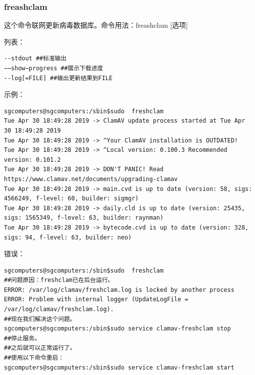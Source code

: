 \documentclass{book}
\begin{document}
\subsubsection{freashclam}
\cite{mancf}\par
这个命令联网更新病毒数据库。命令用法：freashclam [选项] \par
[选项]列表：\par
\begin{verbatim}
--stdout ##标准输出
−−show−progress ##展示下载进度
--log[=FILE] ##输出更新结果到FILE
\end{verbatim}
示例：
\begin{verbatim}
sgcomputers@sgcomputers:/sbin$sudo  freshclam
Tue Apr 30 18:49:28 2019 -> ClamAV update process started at Tue Apr 30 18:49:28 2019
Tue Apr 30 18:49:28 2019 -> ^Your ClamAV installation is OUTDATED!
Tue Apr 30 18:49:28 2019 -> ^Local version: 0.100.3 Recommended version: 0.101.2
Tue Apr 30 18:49:28 2019 -> DON'T PANIC! Read https://www.clamav.net/documents/upgrading-clamav
Tue Apr 30 18:49:28 2019 -> main.cvd is up to date (version: 58, sigs: 4566249, f-level: 60, builder: sigmgr)
Tue Apr 30 18:49:28 2019 -> daily.cld is up to date (version: 25435, sigs: 1565349, f-level: 63, builder: raynman)
Tue Apr 30 18:49:28 2019 -> bytecode.cvd is up to date (version: 328, sigs: 94, f-level: 63, builder: neo)
\end{verbatim}
错误：
\begin{verbatim}
sgcomputers@sgcomputers:/sbin$sudo  freshclam
##问题原因：freshclam已在后台运行。
ERROR: /var/log/clamav/freshclam.log is locked by another process
ERROR: Problem with internal logger (UpdateLogFile = /var/log/clamav/freshclam.log).
##现在我们解决这个问题。
sgcomputers@sgcomputers:/sbin$sudo service clamav-freshclam stop
##停止服务。
##之后就可以正常运行了。
##使用以下命令重启：
sgcomputers@sgcomputers:/sbin$sudo service clamav-freshclam start
\end{verbatim}
\end{document}
